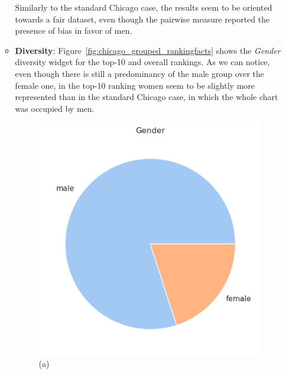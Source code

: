 \begin{itemize}
\begin{itemize}
\begin{itemize}
\end{itemize}
Similarly to the standard Chicago case, the results seem to be oriented towards a fair dataset, even though the pairwise measure reported the presence of bias in favor of men.
\item \textbf{Diversity}: Figure~\ref{fig:chicago_grouped_rankingfacts} shows the \textit{Gender} diversity widget for the top-10 and overall rankings. As we can notice, even though there is still a predominancy of the male group over the female one, in the top-10 ranking women seem to be slightly more represented than in the standard Chicago case, in which the whole chart was occupied by men.

\begin{figure}[t!]
\centering
\begin{minipage}{0.45\textwidth}
\centering
\includegraphics[width=\textwidth]{figures/chicago_grouped_rankingfacts1a.png}
\caption*{(a)}
\end{minipage}
\begin{minipage}{0.45\textwidth}
\centering

\end{minipage}
\end{figure}
\end{itemize}
\end{itemize}
